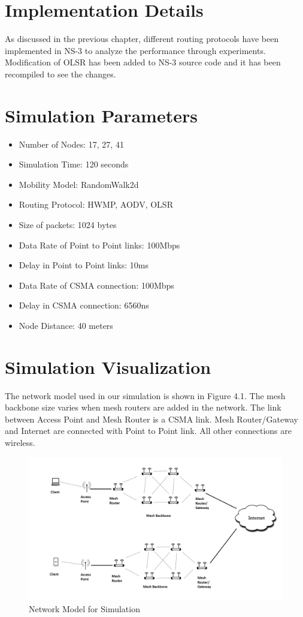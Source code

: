 \documentclass[12pt,a4paper]{report}
\begin{document}
\section{Implementation Details}
As discussed in the previous chapter, different routing protocols have been implemented in NS-3 to analyze the performance through experiments. Modification of OLSR has been added to NS-3 source code and it has been recompiled to see the changes. 

\section{Simulation Parameters}
\begin{itemize}
\item 
Number of Nodes: 17, 27, 41
\item 
Simulation Time: 120 seconds
\item 
Mobility Model: RandomWalk2d 
\item 
Routing Protocol: HWMP, AODV, OLSR
\item 
Size of packets: 1024 bytes
\item 
Data Rate of Point to Point links: 100Mbps
\item
Delay in Point to Point links: 10ms
\item 
Data Rate of CSMA connection: 100Mbps
\item
Delay in CSMA connection: 6560ns
\item
Node Distance: 40 meters
\end{itemize}

\section{Simulation Visualization}
The network model used in our simulation is shown in Figure 4.1. The mesh backbone size varies when mesh routers are added in the network. The link between Access Point and Mesh Router is a CSMA link. Mesh Router/Gateway and Internet are connected with Point to Point link. All other connections are wireless.
\begin{figure}[hbtp]
\centering
\includegraphics[scale=.5]{Network-Model.png}
\caption{Network Model for Simulation}
\end{figure}
\newpage
\end{document}
